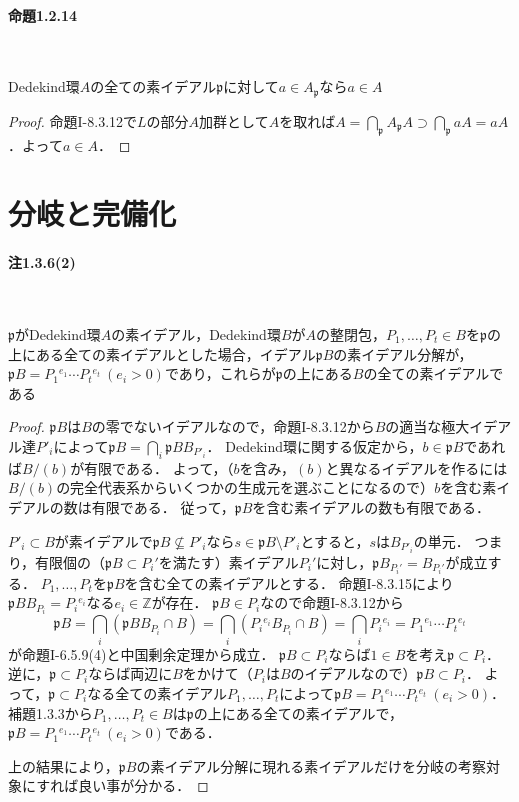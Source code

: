 \paragraph{命題1.2.14}~
\begin{screen}
  Dedekind環$A$の全ての素イデアル$\mathfrak{p}$に対して$a\in A_\mathfrak{p}$なら$a\in A$
\end{screen}
\begin{proof}
  命題I-8.3.12で$L$の部分$A$加群として$A$を取れば$A = \bigcap_\mathfrak{p}A_\mathfrak{p}A\supset\bigcap_\mathfrak{p}aA = aA$．よって$a\in A$．
\end{proof}

\section{分岐と完備化}
\paragraph{注1.3.6(2)}~
\begin{screen}
  $\mathfrak{p}$がDedekind環$A$の素イデアル，Dedekind環$B$が$A$の整閉包，$P_1, \ldots, P_t\in B$を$\mathfrak{p}$の上にある全ての素イデアルとした場合，イデアル$\mathfrak{p}B$の素イデアル分解が，$\mathfrak{p}B = P_1{}^{e_1}\cdots P_t{}^{e_t}\ (e_i>0)$であり，これらが$\mathfrak{p}$の上にある$B$の全ての素イデアルである
\end{screen}
\begin{proof}
  $\mathfrak{p}B$は$B$の零でないイデアルなので，命題I-8.3.12から$B$の適当な極大イデアル達$P'_i$によって$\mathfrak{p}B = \bigcap_i\mathfrak{p}BB_{P'_i}$．
  Dedekind環に関する仮定から，$b\in\mathfrak{p}B$であれば$B/(b)$が有限である．
  よって，（$b$を含み，$(b)$と異なるイデアルを作るには$B/(b)$の完全代表系からいくつかの生成元を選ぶことになるので）$b$を含む素イデアルの数は有限である．
  従って，$\mathfrak{p}B$を含む素イデアルの数も有限である．

  $P'_i\subset B$が素イデアルで$\mathfrak{p}B\nsubseteq P'_i$なら$s\in\mathfrak{p}B\setminus P'_i$とすると，$s$は$B_{P'_i}$の単元．
  つまり，有限個の（$\mathfrak{p}B\subset P_i'$を満たす）素イデアル$P_i'$に対し，$\mathfrak{p}B_{P_i'} = B_{P_i'}$が成立する．
  $P_1, \ldots, P_t$を$\mathfrak{p}B$を含む全ての素イデアルとする．
  命題I-8.3.15により$\mathfrak{p}BB_{P_i} = P_i{}^{e_i}$なる$e_i\in\mathbb{Z}$が存在．
  $\mathfrak{p}B\in P_i$なので命題I-8.3.12から
  \[\mathfrak{p}B = \bigcap_i(\mathfrak{p}BB_{P_i}\cap B) = \bigcap_i(P_i{}^{e_i}B_{P_i}\cap B) = \bigcap_i P_i{}^{e_i} = P_1{}^{e_1}\cdots P_t{}^{e_t}\]
  が命題I-6.5.9(4)と中国剰余定理から成立．
  $\mathfrak{p}B\subset P_i$ならば$1\in B$を考え$\mathfrak{p}\subset P_i$．
  逆に，$\mathfrak{p}\subset P_i$ならば両辺に$B$をかけて（$P_i$は$B$のイデアルなので）$\mathfrak{p}B\subset P_i$．
  よって，$\mathfrak{p}\subset P_i$なる全ての素イデアル$P_1, \ldots, P_t$によって$\mathfrak{p}B = P_1{}^{e_1}\cdots P_t{}^{e_t} ~ (e_i>0)$．
  補題1.3.3から$P_1, \ldots, P_t\in B$は$\mathfrak{p}$の上にある全ての素イデアルで，$\mathfrak{p}B = P_1{}^{e_1}\cdots P_t{}^{e_t}~ (e_i>0)$である．

  上の結果により，$\mathfrak{p}B$の素イデアル分解に現れる素イデアルだけを分岐の考察対象にすれば良い事が分かる．
\end{proof}

